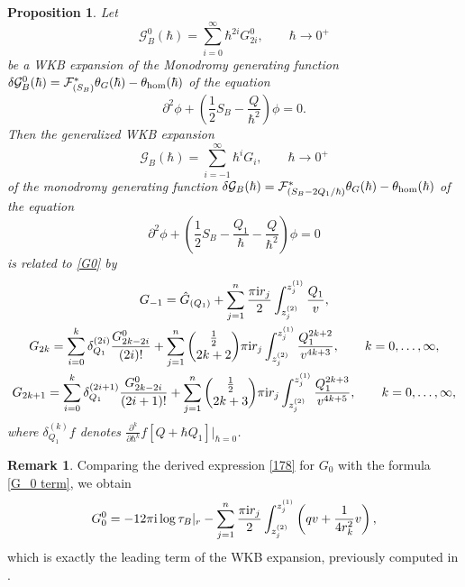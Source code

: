 \documentclass[pdftex]{sigma}
\numberwithin{equation}{section}
\newtheorem{Proposition}[Theorem]{Proposition}
\theoremstyle{definition}
\newtheorem{Remark}[Theorem]{Remark}
\begin{document}
\begin{Proposition}
Let \begin{equation} \label{G0}
\mathcal{G}^0_B(\hbar) =\sum^{\infty}_{i=0} \hbar^{2i} G^0_{2i}, \qquad \hbar \xrightarrow[]{} 0^+
\end{equation} be a WKB expansion of the Monodromy generating function $\delta\mathcal{G}^0_B(\hbar)=\mathcal{F}_{(S_B)}^*\theta_{G}(\hbar)-\theta_{{\rm hom}}(\hbar)$ of the equation
\begin{equation*}\partial^2\phi+\left(\frac{1}{2}S_B-\frac{Q }{\hbar^2}\right)\phi=0.\end{equation*}
Then the generalized WKB expansion
\begin{equation*}\mathcal{G}_B(\hbar) =\sum^{\infty}_{i=-1} \hbar^i G_i, \qquad \hbar \xrightarrow[]{} 0^+ \end{equation*}
of the monodromy generating function $\delta \mathcal{G}_{B}(\hbar)=\mathcal{F}_{(S_B-{2Q_1}/{\hbar})}^*\theta_{G}(\hbar)-\theta_{{\rm hom}}(\hbar)$ of the equation
\begin{equation*}\partial^2 \phi+\left(\frac{1}{2}S_B-\frac{{Q}_1}{\hbar}-\frac{Q}{\hbar^2}\right)\phi=0\end{equation*}
is related to \eqref{G0} by
\begin{gather}
G_{-1} =\Hat{G}_{(Q_1)}+\sum^n_{j=1}\frac{\pi{\rm i} r_j}{2}
\int^{z^{(1)}_j}_{z^{(2)}_j}\frac{{Q}_1}{v} ,\nonumber
\\
 \label{G_0 term}
G_{2k}=\sum^k_{i=0}\delta^{(2i)}_{Q_1}\frac{G^0_{2k-2i}}{(2i)!}+\sum^n_{j=1}\binom{\frac{1}{2}}{2k+2}
\pi{\rm i} r_j \int^{z^{(1)}_j}_{z^{(2)}_j}\frac{{Q}^{2k+2}_1}{v^{4k+3}}, \qquad k=0,\dots, \infty ,\\
\label{tpl}G_{2k+1}=\sum^k_{i=0}\delta^{(2i+1)}_{Q_1}\frac{G^0_{2k-2i}}{(2i+1)!}+\sum^n_{j=1}\binom{\frac{1}{2}}{2k+3}\pi{\rm i} r_j \int^{z^{(1)}_j}_{z^{(2)}_j}\frac{{Q}^{2k+3}_1}{v^{4k+5}}, \qquad k=0,\dots, \infty,
\end{gather}
where $\delta^{(k)}_{Q_1} f$ denotes $\frac{\partial^k}{\partial \hbar^k}f[Q+\hbar Q_1]\big|_{\hbar=0}$.
\end{Proposition}

\begin{Remark}
Comparing the derived expression \eqref{178} for $G_0$ with the formula \eqref{G_0 term}, we obtain
\[
G^0_0=-12 \pi{\rm i} \log \tau_B|_{r} -\sum^n_{j=1}\frac{\pi{\rm i} r_j}{2} \int^{z^{(1)}_j}_{z^{(2)}_j}\left(qv+\frac{1}{4r^2_k}v \right),
\]
which is exactly the leading term of the WKB expansion, previously computed in \cite{bertola2021wkb}.
\end{Remark}
\end{document}

